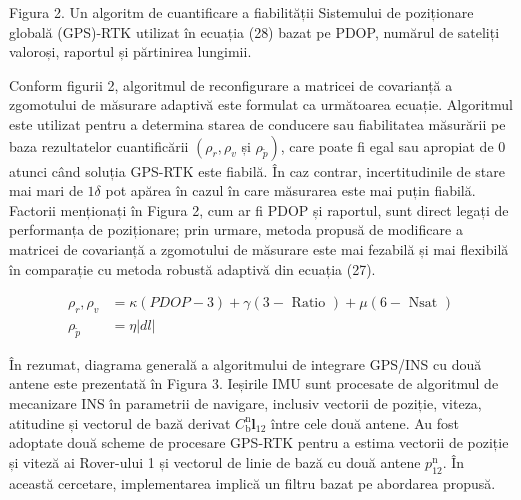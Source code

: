 \documentclass[10pt]{report}
\begin{document}
Figura 2. Un algoritm de cuantificare a fiabilității Sistemului de poziționare globală (GPS)-RTK utilizat în ecuația (28) bazat pe PDOP, numărul de sateliți valoroși, raportul și părtinirea lungimii.

Conform figurii 2, algoritmul de reconfigurare a matricei de covarianță a zgomotului de măsurare adaptivă este formulat ca următoarea ecuație. Algoritmul este utilizat pentru a determina starea de conducere sau fiabilitatea măsurării pe baza rezultatelor cuantificării $\left(\rho_{r}, \rho_{v}\right.$ și $\left.\rho_{\tilde{p}} \right)$, care poate fi egal sau apropiat de 0 atunci când soluția GPS-RTK este fiabilă. În caz contrar, incertitudinile de stare mai mari de $1 \delta$ pot apărea în cazul în care măsurarea este mai puțin fiabilă. Factorii menționați în Figura 2, cum ar fi PDOP și raportul, sunt direct legați de performanța de poziționare; prin urmare, metoda propusă de modificare a matricei de covarianță a zgomotului de măsurare este mai fezabilă și mai flexibilă în comparație cu metoda robustă adaptivă din ecuația (27).

\begin{equation}
  \begin{aligned}
    \rho_{r}, \rho_{v} & =\kappa(P D O P-3)+\gamma(3-\text { Ratio })+\mu(6-\text { Nsat }) \\
    \rho_{\tilde{p}}   & =\eta|d l|
  \end{aligned}
\end{equation}

În rezumat, diagrama generală a algoritmului de integrare GPS/INS cu două antene este prezentată în Figura 3. Ieșirile IMU sunt procesate de algoritmul de mecanizare INS în parametrii de navigare, inclusiv vectorii de poziție, viteza, atitudine și vectorul de bază derivat $ C_{\mathrm{b}}^{\mathrm{n}} \boldsymbol{l}_{12}$ între cele două antene. Au fost adoptate două scheme de procesare GPS-RTK pentru a estima vectorii de poziție și viteză ai Rover-ului 1 și vectorul de linie de bază cu două antene $p_{12}^{\mathrm{n}}$. În această cercetare, implementarea implică un filtru bazat pe abordarea propusă.
\end{document}
